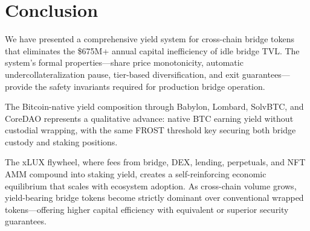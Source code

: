 \documentclass[11pt,twocolumn]{article}
\begin{document}
\section{Conclusion}\label{sec:conclusion}

We have presented a comprehensive yield system for cross-chain bridge tokens that eliminates the \$675M+ annual capital inefficiency of idle bridge TVL. The system's formal properties---share price monotonicity, automatic undercollateralization pause, tier-based diversification, and exit guarantees---provide the safety invariants required for production bridge operation.

The Bitcoin-native yield composition through Babylon, Lombard, SolvBTC, and CoreDAO represents a qualitative advance: native BTC earning yield without custodial wrapping, with the same FROST threshold key securing both bridge custody and staking positions.

The xLUX flywheel, where fees from bridge, DEX, lending, perpetuals, and NFT AMM compound into staking yield, creates a self-reinforcing economic equilibrium that scales with ecosystem adoption. As cross-chain volume grows, yield-bearing bridge tokens become strictly dominant over conventional wrapped tokens---offering higher capital efficiency with equivalent or superior security guarantees.
\end{document}

